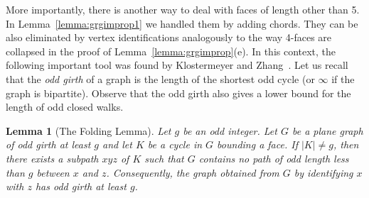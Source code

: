 \documentclass[12pt,twoside,openright,a4paper]{book}
\newtheorem{lemma}[theorem]{Lemma}
\begin{document}
More importantly, there is another way to deal with faces of length other than 5.  In Lemma~\ref{lemma:grgimprop1}
we handled them by adding chords.  They can be also eliminated by vertex identifications analogously to the way
4-faces are collapsed in the proof of Lemma~\ref{lemma:grgimprop}(e).  In this context, the following
important tool was found by Klostermeyer and Zhang~\cite{KloZhang}.  Let us recall that the \emph{odd girth}
of a graph is the length of the shortest odd cycle (or $\infty$ if the graph is bipartite).  Observe that the odd girth
also gives a lower bound for the length of odd closed walks.
\begin{lemma}[The Folding Lemma]\label{lemma:folding}
Let $g$ be an odd integer.  Let $G$ be a plane graph of odd girth at least $g$ and let $K$ be a cycle in $G$ bounding a face.
If $|K|\neq g$, then there exists a subpath $xyz$ of $K$ such that $G$ contains no path of odd length less than $g$
between $x$ and $z$.  Consequently, the graph obtained from $G$ by identifying $x$ with $z$ has odd girth at least $g$.
\end{lemma}
\end{document}
